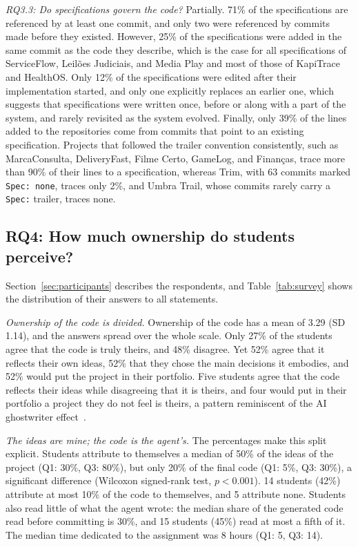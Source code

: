 \documentclass[conference]{IEEEtran}
\begin{document}
\emph{RQ3.3: Do specifications govern the code?} Partially. 71\% of the specifications are referenced by at least one commit, and only two were referenced by commits made before they existed. However, 25\% of the specifications were added in the same commit as the code they describe, which is the case for all specifications of ServiceFlow, Leilões Judiciais, and Media Play and most of those of KapiTrace and HealthOS. Only 12\% of the specifications were edited after their implementation started, and only one explicitly replaces an earlier one, which suggests that specifications were written once, before or along with a part of the system, and rarely revisited as the system evolved. Finally, only 39\% of the lines added to the repositories come from commits that point to an existing specification. Projects that followed the trailer convention consistently, such as MarcaConsulta, DeliveryFast, Filme Certo, GameLog, and Finanças, trace more than 90\% of their lines to a specification, whereas Trim, with 63 commits marked \texttt{Spec: none}, traces only 2\%, and Umbra Trail, whose commits rarely carry a \texttt{Spec:} trailer, traces none.

\subsection{RQ4: How much ownership do students perceive?}

Section~\ref{sec:participants} describes the respondents, and Table~\ref{tab:survey} shows the distribution of their answers to all statements.

\emph{Ownership of the code is divided.} Ownership of the code has a mean of 3.29 (SD 1.14), and the answers spread over the whole scale. Only 27\% of the students agree that the code is truly theirs, and 48\% disagree. Yet 52\% agree that it reflects their own ideas, 52\% that they chose the main decisions it embodies, and 52\% would put the project in their portfolio. Five students agree that the code reflects their ideas while disagreeing that it is theirs, and four would put in their portfolio a project they do not feel is theirs, a pattern reminiscent of the AI ghostwriter effect~\cite{draxler2024}.

\emph{The ideas are mine; the code is the agent's.} The percentages make this split explicit. Students attribute to themselves a median of 50\% of the ideas of the project (Q1: 30\%, Q3: 80\%), but only 20\% of the final code (Q1: 5\%, Q3: 30\%), a significant difference (Wilcoxon signed-rank test, $p < 0.001$). 14 students (42\%) attribute at most 10\% of the code to themselves, and 5 attribute none. Students also read little of what the agent wrote: the median share of the generated code read before committing is 30\%, and 15 students (45\%) read at most a fifth of it. The median time dedicated to the assignment was 8 hours (Q1: 5, Q3: 14).
\end{document}
